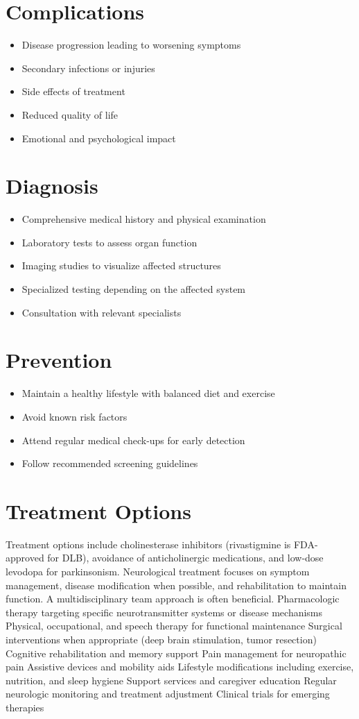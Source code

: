 \section{Complications}
\begin{itemize}[noitemsep]
  \item Disease progression leading to worsening symptoms
  \item Secondary infections or injuries
  \item Side effects of treatment
  \item Reduced quality of life
  \item Emotional and psychological impact
\end{itemize}
\section{Diagnosis}
\begin{itemize}[noitemsep]
  \item Comprehensive medical history and physical examination
  \item Laboratory tests to assess organ function
  \item Imaging studies to visualize affected structures
  \item Specialized testing depending on the affected system
  \item Consultation with relevant specialists
\end{itemize}
\section{Prevention}
\begin{itemize}[noitemsep]
  \item Maintain a healthy lifestyle with balanced diet and exercise
  \item Avoid known risk factors
  \item Attend regular medical check-ups for early detection
  \item Follow recommended screening guidelines
\end{itemize}
\section{Treatment Options}
Treatment options include cholinesterase inhibitors (rivastigmine is FDA-approved for DLB), avoidance of anticholinergic medications, and low-dose levodopa for parkinsonism. Neurological treatment focuses on symptom management, disease modification when possible, and rehabilitation to maintain function. A multidisciplinary team approach is often beneficial. Pharmacologic therapy targeting specific neurotransmitter systems or disease mechanisms Physical, occupational, and speech therapy for functional maintenance Surgical interventions when appropriate (deep brain stimulation, tumor resection) Cognitive rehabilitation and memory support Pain management for neuropathic pain Assistive devices and mobility aids Lifestyle modifications including exercise, nutrition, and sleep hygiene Support services and caregiver education Regular neurologic monitoring and treatment adjustment Clinical trials for emerging therapies

